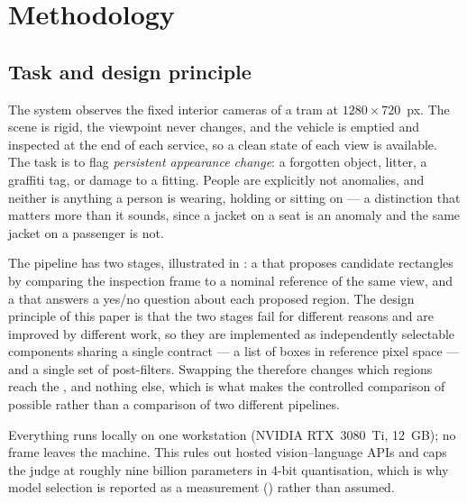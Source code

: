 \section{Methodology}
\label{sec:method}

\subsection{Task and design principle}
\label{sec:method:task}

The system observes the fixed interior cameras of a tram at
$1280 \times 720$~px. The scene is rigid, the viewpoint never changes, and the
vehicle is emptied and inspected at the end of each service, so a clean state
of each view is available. The task is to flag \emph{persistent appearance
change}: a forgotten object, litter, a graffiti tag, or damage to a fitting.
People are explicitly not anomalies, and neither is anything a person is
wearing, holding or sitting on --- a distinction that matters more than it
sounds, since a jacket on a seat is an anomaly and the same jacket on a
passenger is not.

The pipeline has two stages, illustrated in : a
\emph{\proposer} that proposes candidate rectangles by comparing the inspection
frame to a nominal reference of the same view, and a \emph{\judge} that answers
a yes/no question about each proposed region. The design principle of this
paper is that the two stages fail for different reasons and are improved by
different work, so they are implemented as independently selectable components
sharing a single contract --- a list of boxes in reference pixel space --- and
a single set of post-filters. Swapping the \proposer{} therefore changes which
regions reach the \judge{}, and nothing else, which is what makes the
controlled comparison of  possible rather than a
comparison of two different pipelines.

Everything runs locally on one workstation (NVIDIA RTX~3080~Ti, 12~GB); no
frame leaves the machine. This rules out hosted vision--language APIs and caps
the judge at roughly nine billion parameters in 4-bit quantisation, which is
why model selection is reported as a measurement ()
rather than assumed.

